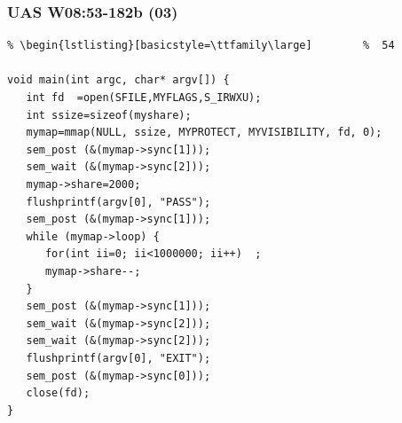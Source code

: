 \documentclass[xcolor=table, notheorems, hyperref={pdfpagelabels=false}]{beamer}
\begin{document}
\begin{frame}[fragile]
\frametitle{UAS W08:53-182b (03)}
\begin{lstlisting}[basicstyle=\ttfamily\footnotesize] %  72
% \begin{lstlisting}[basicstyle=\ttfamily\small]        %  65
% \begin{lstlisting}[basicstyle=\ttfamily\large]        %  54

void main(int argc, char* argv[]) {
   int fd  =open(SFILE,MYFLAGS,S_IRWXU);
   int ssize=sizeof(myshare);
   mymap=mmap(NULL, ssize, MYPROTECT, MYVISIBILITY, fd, 0);
   sem_post (&(mymap->sync[1]));
   sem_wait (&(mymap->sync[2]));
   mymap->share=2000;
   flushprintf(argv[0], "PASS");
   sem_post (&(mymap->sync[1]));
   while (mymap->loop) {
      for(int ii=0; ii<1000000; ii++)  ;
      mymap->share--;
   }
   sem_post (&(mymap->sync[1]));
   sem_wait (&(mymap->sync[2]));
   sem_wait (&(mymap->sync[2]));
   flushprintf(argv[0], "EXIT");
   sem_post (&(mymap->sync[0]));
   close(fd);
}

\end{lstlisting}
\end{frame}

\end{document}
